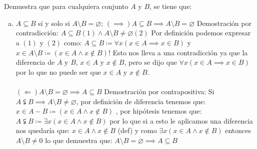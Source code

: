 \section{}
Demuestra que para cualquiera conjunto $A$ y $B$, se tiene que:
\begin{enumerate}[(a)]
    \item $A \subseteq B$ si y solo si $ A \setminus B = \varnothing$; \newline
    $(\implies) A \subseteq B \implies A \setminus B = \varnothing$\newline
    Demostración por contradicción:\newline
    $A \subseteq B(1) \wedge A \setminus B \neq \varnothing(2)$\newline
	Por definición podemos expresar a  $(1)$ y $(2)$ como: \newline
	$A \subseteq B \coloneqq \forall x (x \in A \implies x \in B)$  y $x \in A \setminus B \coloneqq (x \in A \wedge x \notin B) !$\newline
	Esto nos lleva a una contradicción ya que la diferencia de $A$ y $B$, $x \in A$ y $x \notin B$, pero se dijo que  $\forall x(x \in A \implies x \in B)$ por lo que no puede ser que $x \in A$ y $x \notin B$.\\\\
    
    $(\Longleftarrow) A \setminus B = \varnothing \implies A \subseteq B$\newline
    Demostración por contrapositiva:\newline
	Si $A \subsetneqq B \implies A \setminus B \neq \varnothing$, por definición de diferencia tenemos que: \newline
	$x \in A - B \coloneqq (x \in A \wedge x \notin B)$ , por hipótesis tenemos que: \newline
	$A \subsetneqq B \coloneqq \exists x (x \in A \wedge x \notin B )$ por lo que si a esto le aplicamos una diferencia nos quedaría que: \newline
	 $x \in A \wedge x \notin B$ (def) y  como $\exists x (x \in A \wedge x \notin B )$ entonces $A \setminus B \neq 0$ lo que demuestra que:\newline
	 $A \setminus B = \varnothing \implies  A \subseteq B$    
    
    
    

\end{enumerate}
